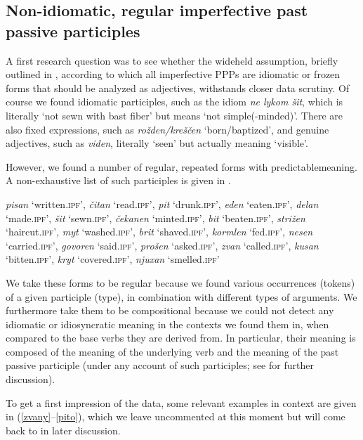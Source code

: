 \documentclass[output=paper,modfonts,newtxmath,hidelinks
]{langscibook}
\begin{document}
\subsection{Non-idiomatic, regular imperfective past passive participles} 
\label{nonidiom}

A first research question was to see whether the wideheld assumption, briefly outlined in , according to which all imperfective PPPs are idiomatic or frozen forms that should be analyzed as adjectives, withstands closer data scrutiny. Of course we found idiomatic participles, such as the idiom \textit{ne lykom šit}, which is literally `not sewn with bast fiber' but means `not simple(-minded)'. There are also fixed expressions, such as \textit{rožden/kreščen} `born/baptized', and genuine adjectives, such as \textit{viden}, literally `seen' but actually meaning `visible'.

However, we found a number of regular, repeated forms with predictable\linebreak meaning. A non-exhaustive list of such participles is given in .

\ea	\textit{pisan} `written.\textsc{ipf}', \textit{čitan} `read.\textsc{ipf}', \textit{pit} `drunk.\textsc{ipf}', \textit{eden} `eaten.\textsc{ipf}', \textit{delan} `made.\textsc{ipf}', \textit{šit} `sewn.\textsc{ipf}', \textit{čekanen} `minted.\textsc{ipf}', \textit{bit} `beaten.\textsc{ipf}', \textit{strižen} `haircut.\textsc{ipf}', \textit{myt} `washed.\textsc{ipf}', \textit{brit} `shaved.\textsc{ipf}', \textit{kormlen} `fed.\textsc{ipf}', \textit{nesen} `carried.\textsc{ipf}', \textit{govoren} `said.\textsc{ipf}', \textit{prošen} `asked.\textsc{ipf}', \textit{zvan} `called.\textsc{ipf}', \textit{kusan} `bitten.\textsc{ipf}', \textit{kryt} `covered.\textsc{ipf}', \textit{njuxan} `smelled.\textsc{ipf}' \label{list}
\z

\noindent We take these forms to be regular because we found various occurrences (tokens) of a given participle (type), in combination with different types of arguments. We furthermore take them to be compositional because we could not detect any idiomatic or idiosyncratic meaning in the contexts we found them in, when compared to the base verbs they are derived from. In particular, their meaning is composed of the meaning of the underlying verb and the meaning of the past passive participle (under any account of such participles; see  for further discussion). 

To get a first impression of the data, some relevant examples in context are given in (\ref{zvany}--\ref{pito}), which we leave uncommented at this moment but will come back to in later discussion. 
\end{document}
